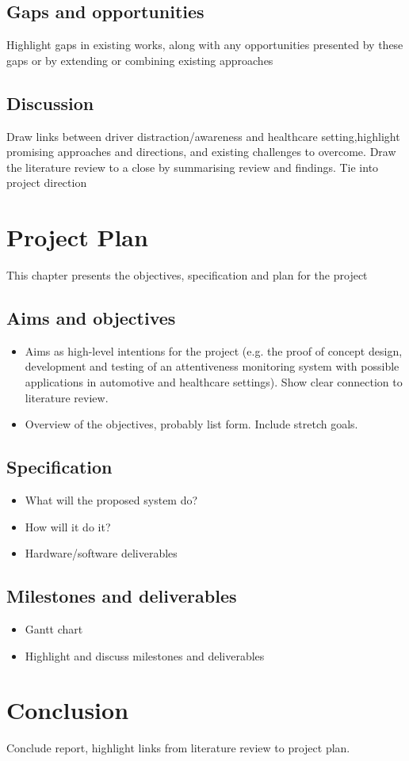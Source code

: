 \documentclass[11pt, parskip=half*,twoside=false]{scrbook}
\begin{document}
\section{Gaps and opportunities}
Highlight gaps in existing works, along with any opportunities presented by these gaps or by extending or combining existing approaches

\section{Discussion}
Draw links between driver distraction/awareness and healthcare setting,highlight promising approaches and directions, and existing challenges to overcome. Draw the literature review to a close by summarising review and findings. Tie into project direction


\chapter{Project Plan}
This chapter presents the objectives, specification and plan for the project

\section{Aims and objectives}
\begin{itemize}
	\item Aims as high-level intentions for the project (e.g. the proof of concept design, development and testing of an attentiveness monitoring system with possible applications in automotive and healthcare settings). Show clear connection to literature review. 
	\item Overview of the objectives, probably list form. Include stretch goals.
\end{itemize}

\section{Specification}
\begin{itemize}
	\item What will the proposed system do?
	\item How will it do it?
	\item Hardware/software deliverables
\end{itemize}

\section{Milestones and deliverables}
\begin{itemize}
	\item Gantt chart
	\item Highlight and discuss milestones and deliverables
\end{itemize}

\chapter{Conclusion}
Conclude report, highlight links from literature review to project plan.


\end{document}
